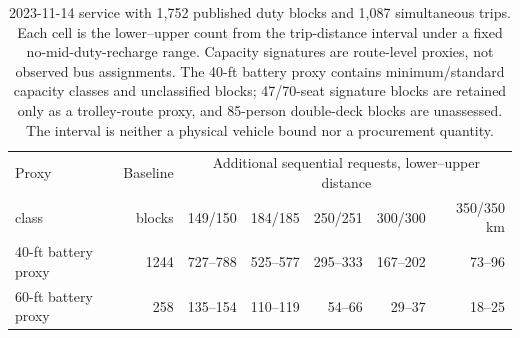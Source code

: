 \begin{table}[htbp]
\centering
\begin{tabular}{@{}lrrrrrr@{}}
\toprule
Proxy & Baseline & \multicolumn{5}{c}{Additional sequential requests, lower--upper distance}\\
class & blocks & 149/150 & 184/185 & 250/251 & 300/300 & 350/350 km\\
\midrule
40-ft battery proxy & 1244 & 727--788 & 525--577 & 295--333 & 167--202 & 73--96\\
60-ft battery proxy & 258 & 135--154 & 110--119 & 54--66 & 29--37 & 18--25\\
\bottomrule
\end{tabular}
\caption{2023-11-14 service with 1,752 published duty blocks and 1,087 simultaneous trips. Each cell is the lower--upper count from the trip-distance interval under a fixed no-mid-duty-recharge range. Capacity signatures are route-level proxies, not observed bus assignments. The 40-ft battery proxy contains minimum/standard capacity classes and unclassified blocks; 47/70-seat signature blocks are retained only as a trolley-route proxy, and 85-person double-deck blocks are unassessed. The interval is neither a physical vehicle bound nor a procurement quantity.}
\end{table}
